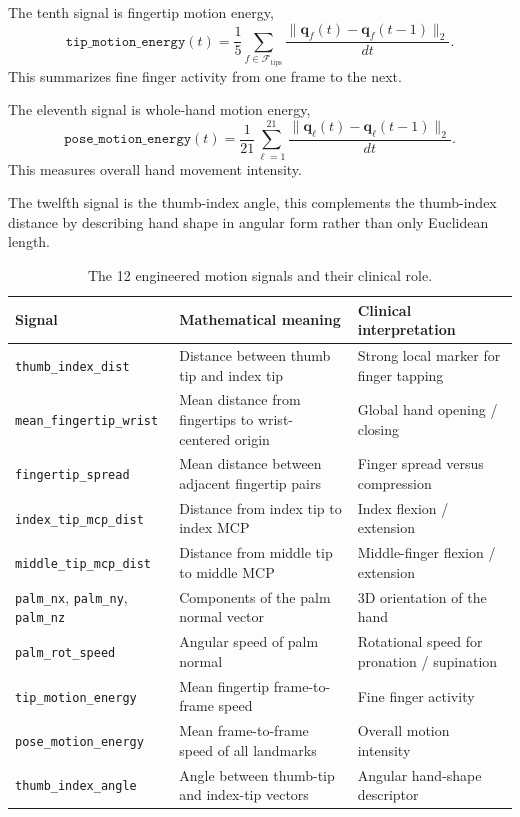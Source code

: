 \documentclass[10pt,twocolumn]{article}
\begin{document}
The tenth signal is fingertip motion energy,
\begin{equation}
\texttt{tip\_motion\_energy}(t)=\frac{1}{5}\sum_{f \in \mathcal{F}_{\mathrm{tips}}}
\frac{\|\mathbf{q}_f(t)-\mathbf{q}_f(t-1)\|_2}{dt}.
\end{equation}
This summarizes fine finger activity from one frame to the next.

The eleventh signal is whole-hand motion energy,
\begin{equation}
\texttt{pose\_motion\_energy}(t)=\frac{1}{21}\sum_{\ell=1}^{21}
\frac{\|\mathbf{q}_{\ell}(t)-\mathbf{q}_{\ell}(t-1)\|_2}{dt}.
\end{equation}
This measures overall hand movement intensity.

The twelfth signal is the thumb-index angle, this complements the thumb-index distance by describing hand shape in angular form rather than only Euclidean length.

\begin{table}[t]
\centering
\caption{The 12 engineered motion signals and their clinical role.}
\label{tab:signals-short}
\begin{tabular}{p{3.2cm}p{5.9cm}p{6.0cm}}
\toprule
Signal & Mathematical meaning & Clinical interpretation \\
\midrule
\texttt{thumb\_index\_dist} & Distance between thumb tip and index tip & Strong local marker for finger tapping \\
\texttt{mean\_fingertip\_wrist} & Mean distance from fingertips to wrist-centered origin & Global hand opening / closing \\
\texttt{fingertip\_spread} & Mean distance between adjacent fingertip pairs & Finger spread versus compression \\
\texttt{index\_tip\_mcp\_dist} & Distance from index tip to index MCP & Index flexion / extension \\
\texttt{middle\_tip\_mcp\_dist} & Distance from middle tip to middle MCP & Middle-finger flexion / extension \\
\texttt{palm\_nx}, \texttt{palm\_ny}, \texttt{palm\_nz} & Components of the palm normal vector & 3D orientation of the hand \\
\texttt{palm\_rot\_speed} & Angular speed of palm normal & Rotational speed for pronation / supination \\
\texttt{tip\_motion\_energy} & Mean fingertip frame-to-frame speed & Fine finger activity \\
\texttt{pose\_motion\_energy} & Mean frame-to-frame speed of all landmarks & Overall motion intensity \\
\texttt{thumb\_index\_angle} & Angle between thumb-tip and index-tip vectors & Angular hand-shape descriptor \\
\bottomrule
\end{tabular}
\end{table}
\end{document}
